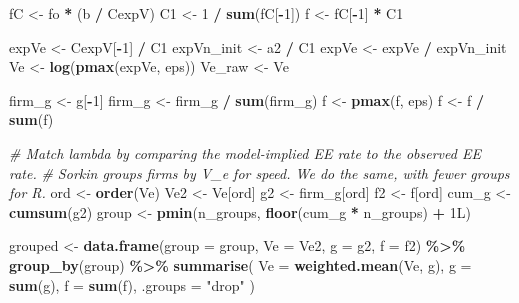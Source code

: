 \documentclass[
]{article}
\newenvironment{Shaded}{\begin{snugshade}}{\end{snugshade}}
\newcommand{\AttributeTok}[1]{\textcolor[rgb]{0.13,0.29,0.53}{#1}}
\newcommand{\CommentTok}[1]{\textcolor[rgb]{0.56,0.35,0.01}{\textit{#1}}}
\newcommand{\DataTypeTok}[1]{\textcolor[rgb]{0.13,0.29,0.53}{#1}}
\newcommand{\DecValTok}[1]{\textcolor[rgb]{0.00,0.00,0.81}{#1}}
\newcommand{\FunctionTok}[1]{\textcolor[rgb]{0.13,0.29,0.53}{\textbf{#1}}}
\newcommand{\NormalTok}[1]{#1}
\newcommand{\OtherTok}[1]{\textcolor[rgb]{0.56,0.35,0.01}{#1}}
\newcommand{\SpecialCharTok}[1]{\textcolor[rgb]{0.81,0.36,0.00}{\textbf{#1}}}
\newcommand{\StringTok}[1]{\textcolor[rgb]{0.31,0.60,0.02}{#1}}
\begin{document}
\begin{Shaded}
\begin{Highlighting}[]
\NormalTok{    fC }\OtherTok{\textless{}{-}}\NormalTok{ fo }\SpecialCharTok{*}\NormalTok{ (b }\SpecialCharTok{/}\NormalTok{ CexpV)}
\NormalTok{    C1 }\OtherTok{\textless{}{-}} \DecValTok{1} \SpecialCharTok{/} \FunctionTok{sum}\NormalTok{(fC[}\SpecialCharTok{{-}}\DecValTok{1}\NormalTok{])}
\NormalTok{    f }\OtherTok{\textless{}{-}}\NormalTok{ fC[}\SpecialCharTok{{-}}\DecValTok{1}\NormalTok{] }\SpecialCharTok{*}\NormalTok{ C1}

\NormalTok{    expVe }\OtherTok{\textless{}{-}}\NormalTok{ CexpV[}\SpecialCharTok{{-}}\DecValTok{1}\NormalTok{] }\SpecialCharTok{/}\NormalTok{ C1}
\NormalTok{    expVn\_init }\OtherTok{\textless{}{-}}\NormalTok{ a2 }\SpecialCharTok{/}\NormalTok{ C1}
\NormalTok{    expVe }\OtherTok{\textless{}{-}}\NormalTok{ expVe }\SpecialCharTok{/}\NormalTok{ expVn\_init}
\NormalTok{    Ve }\OtherTok{\textless{}{-}} \FunctionTok{log}\NormalTok{(}\FunctionTok{pmax}\NormalTok{(expVe, eps))}
\NormalTok{    Ve\_raw }\OtherTok{\textless{}{-}}\NormalTok{ Ve}

\NormalTok{    firm\_g }\OtherTok{\textless{}{-}}\NormalTok{ g[}\SpecialCharTok{{-}}\DecValTok{1}\NormalTok{]}
\NormalTok{    firm\_g }\OtherTok{\textless{}{-}}\NormalTok{ firm\_g }\SpecialCharTok{/} \FunctionTok{sum}\NormalTok{(firm\_g)}
\NormalTok{    f }\OtherTok{\textless{}{-}} \FunctionTok{pmax}\NormalTok{(f, eps)}
\NormalTok{    f }\OtherTok{\textless{}{-}}\NormalTok{ f }\SpecialCharTok{/} \FunctionTok{sum}\NormalTok{(f)}

    \CommentTok{\# Match lambda by comparing the model{-}implied EE rate to the observed EE rate.}
    \CommentTok{\# Sorkin groups firms by V\_e for speed. We do the same, with fewer groups for R.}
\NormalTok{    ord }\OtherTok{\textless{}{-}} \FunctionTok{order}\NormalTok{(Ve)}
\NormalTok{    Ve2 }\OtherTok{\textless{}{-}}\NormalTok{ Ve[ord]}
\NormalTok{    g2 }\OtherTok{\textless{}{-}}\NormalTok{ firm\_g[ord]}
\NormalTok{    f2 }\OtherTok{\textless{}{-}}\NormalTok{ f[ord]}
\NormalTok{    cum\_g }\OtherTok{\textless{}{-}} \FunctionTok{cumsum}\NormalTok{(g2)}
\NormalTok{    group }\OtherTok{\textless{}{-}} \FunctionTok{pmin}\NormalTok{(n\_groups, }\FunctionTok{floor}\NormalTok{(cum\_g }\SpecialCharTok{*}\NormalTok{ n\_groups) }\SpecialCharTok{+} \DecValTok{1}\DataTypeTok{L}\NormalTok{)}

\NormalTok{    grouped }\OtherTok{\textless{}{-}} \FunctionTok{data.frame}\NormalTok{(}\AttributeTok{group =}\NormalTok{ group, }\AttributeTok{Ve =}\NormalTok{ Ve2, }\AttributeTok{g =}\NormalTok{ g2, }\AttributeTok{f =}\NormalTok{ f2) }\SpecialCharTok{\%\textgreater{}\%}
        \FunctionTok{group\_by}\NormalTok{(group) }\SpecialCharTok{\%\textgreater{}\%}
        \FunctionTok{summarise}\NormalTok{(}
            \AttributeTok{Ve =} \FunctionTok{weighted.mean}\NormalTok{(Ve, g),}
            \AttributeTok{g =} \FunctionTok{sum}\NormalTok{(g),}
            \AttributeTok{f =} \FunctionTok{sum}\NormalTok{(f),}
            \AttributeTok{.groups =} \StringTok{"drop"}
\NormalTok{        )}


\end{Highlighting}
\end{Shaded}
\end{document}
